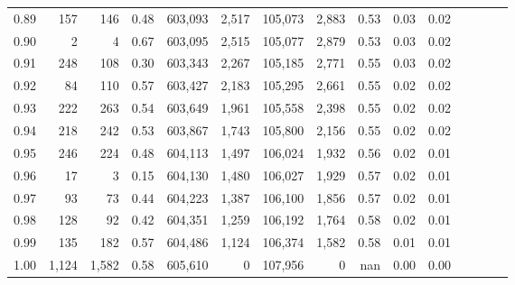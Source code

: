 \begin{tabular}{rrrcrrrrrrrrrrr}
0.89 &     157 &    146 &                                       0.48 &  603,093 &    2,517 &  105,073 &    2,883 &  0.53 &  0.03 &                         0.02 \\
0.90 &       2 &      4 &                                       0.67 &  603,095 &    2,515 &  105,077 &    2,879 &  0.53 &  0.03 &                         0.02 \\
0.91 &     248 &    108 &                                       0.30 &  603,343 &    2,267 &  105,185 &    2,771 &  0.55 &  0.03 &                         0.02 \\
0.92 &      84 &    110 &                                       0.57 &  603,427 &    2,183 &  105,295 &    2,661 &  0.55 &  0.02 &                         0.02 \\
0.93 &     222 &    263 &                                       0.54 &  603,649 &    1,961 &  105,558 &    2,398 &  0.55 &  0.02 &                         0.02 \\
0.94 &     218 &    242 &                                       0.53 &  603,867 &    1,743 &  105,800 &    2,156 &  0.55 &  0.02 &                         0.02 \\
0.95 &     246 &    224 &                                       0.48 &  604,113 &    1,497 &  106,024 &    1,932 &  0.56 &  0.02 &                         0.01 \\
0.96 &      17 &      3 &                                       0.15 &  604,130 &    1,480 &  106,027 &    1,929 &  0.57 &  0.02 &                         0.01 \\
0.97 &      93 &     73 &                                       0.44 &  604,223 &    1,387 &  106,100 &    1,856 &  0.57 &  0.02 &                         0.01 \\
0.98 &     128 &     92 &                                       0.42 &  604,351 &    1,259 &  106,192 &    1,764 &  0.58 &  0.02 &                         0.01 \\
0.99 &     135 &    182 &                                       0.57 &  604,486 &    1,124 &  106,374 &    1,582 &  0.58 &  0.01 &                         0.01 \\
1.00 &   1,124 &  1,582 &                                       0.58 &  605,610 &        0 &  107,956 &        0 &   nan &  0.00 &                         0.00 \\
\bottomrule
\end{tabular}
